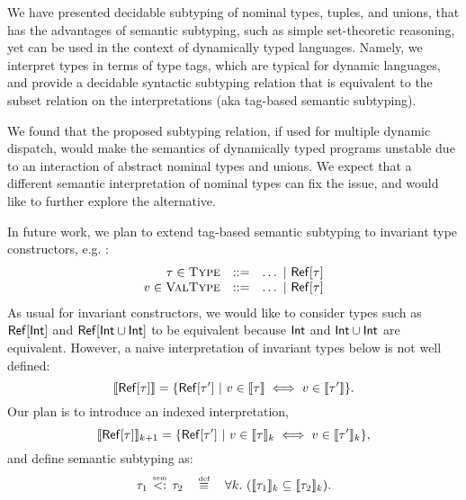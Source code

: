 We have presented decidable subtyping of nominal types, tuples, and unions, 
that has the advantages of semantic subtyping, 
such as simple set-theoretic reasoning, 
yet can be used in the context of dynamically typed languages.
Namely, we interpret types in terms of type tags, 
which are typical for dynamic languages,
and provide a decidable syntactic subtyping relation that is
equivalent to the subset relation on the interpretations
(aka tag-based semantic subtyping).

We found that the proposed subtyping relation, 
if used for multiple dynamic dispatch, 
would make the semantics of dynamically typed programs unstable
due to an interaction of abstract nominal types and unions.
We expect that a different semantic interpretation of nominal types 
can fix the issue, and would like to further explore the alternative.

In future work, we plan to extend tag-based semantic subtyping 
to invariant type constructors, e.g. :
\[
\begin{array}{rcl}
\tau \in \textsc{Type}   &::=& \ldots ~\vert~ \mathsf{Ref}[\tau]\\
v \in \textsc{ValType} &::=& \ldots ~\vert~ \mathsf{Ref}[\tau]
\end{array}
\]
As usual for invariant constructors, 
we would like to consider types such as $\mathsf{Ref}[\mathsf{Int}]$
and $\mathsf{Ref}[\mathsf{Int} \cup \mathsf{Int}]$ to be equivalent
because $\mathsf{Int}$ and $\mathsf{Int} \cup \mathsf{Int}$ are equivalent.
However, a naive interpretation of invariant types below
is not well defined:
\[
\llbracket \mathsf{Ref}[\tau] \rrbracket = 
\{ \mathsf{Ref}[\tau'] ~\vert~ v \in \llbracket \tau \rrbracket \iff v \in \llbracket \tau' \rrbracket \}.
\]
Our plan is to introduce an indexed interpretation,
\[
\llbracket \mathsf{Ref}[\tau] \rrbracket_{k+1} = \{ \mathsf{Ref}[\tau'] 
    ~\vert~ v \in \llbracket \tau \rrbracket_k \iff v \in \llbracket \tau' \rrbracket_k \},
\]
and define semantic subtyping as:
\[
\bjtruesemsub{\ty_1}{\ty_2} \quad \defsign \quad
\forall k.\ (\interpty{\ty_1}_k \subseteq \interpty{\ty_2}_k).
\]

